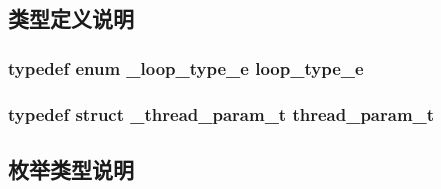 \subsection{类型定义说明}
\hypertarget{a00099_a93730d5de4a5f4dbe3013b02b051df62_a93730d5de4a5f4dbe3013b02b051df62}{}
\subsubsection[{loop\+\_\+type\+\_\+e}]{\setlength{\rightskip}{0pt plus 5cm}typedef enum {\bf \+\_\+loop\+\_\+type\+\_\+e}  {\bf loop\+\_\+type\+\_\+e}}\label{a00099_a93730d5de4a5f4dbe3013b02b051df62_a93730d5de4a5f4dbe3013b02b051df62}
\hypertarget{a00099_aaca514c4c0b391f40ccc7e8c68fd4c21_aaca514c4c0b391f40ccc7e8c68fd4c21}{}
\subsubsection[{thread\+\_\+param\+\_\+t}]{\setlength{\rightskip}{0pt plus 5cm}typedef struct {\bf \+\_\+thread\+\_\+param\+\_\+t}  {\bf thread\+\_\+param\+\_\+t}}\label{a00099_aaca514c4c0b391f40ccc7e8c68fd4c21_aaca514c4c0b391f40ccc7e8c68fd4c21}


\subsection{枚举类型说明}
\hypertarget{a00099_a2583618f1d6afdd0085a96f59b45d9bd_a2583618f1d6afdd0085a96f59b45d9bd}{}
